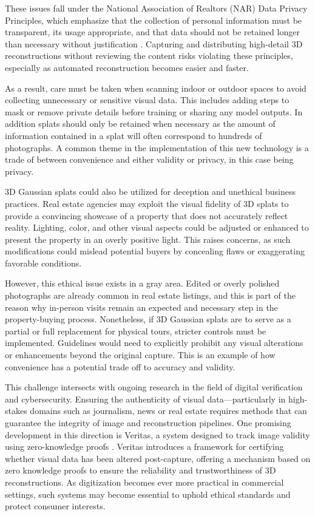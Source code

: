 \documentclass[10pt,twocolumn]{article}
\begin{document}
These issues fall under the National Association of Realtors (NAR) Data Privacy Principles, which emphasize that the collection of personal information must be transparent, its usage appropriate, and that data should not be retained longer than necessary without justification \cite{narDataPrivacyPrinciples}. Capturing and distributing high-detail 3D reconstructions without reviewing the content risks violating these principles, especially as automated reconstruction becomes easier and faster.

As a result, care must be taken when scanning indoor or outdoor spaces to avoid collecting unnecessary or sensitive visual data. This includes adding steps to mask or remove private details before training or sharing any model outputs. In addition splats should only be retained when necessary as the amount of information contained in a splat will often correspond to hundreds of photographs. A common theme in the implementation of this new technology is a trade of between convenience and either validity or privacy, in this case being privacy.

3D Gaussian splats could also be utilized for deception and unethical business practices. Real estate agencies may exploit the visual fidelity of 3D splats to provide a convincing showcase of a property that does not accurately reflect reality. Lighting, color, and other visual aspects could be adjusted or enhanced to present the property in an overly positive light. This raises concerns, as such modifications could mislead potential buyers by concealing flaws or exaggerating favorable conditions.

However, this ethical issue exists in a gray area. Edited or overly polished photographs are already common in real estate listings, and this is part of the reason why in-person visits remain an expected and necessary step in the property-buying process. Nonetheless, if 3D Gaussian splats are to serve as a partial or full replacement for physical tours, stricter controls must be implemented. Guidelines would need to explicitly prohibit any visual alterations or enhancements beyond the original capture. This is an example of how convenience has a potential trade off to accuracy and validity.

This challenge intersects with ongoing research in the field of digital verification and cybersecurity. Ensuring the authenticity of visual data—particularly in high-stakes domains such as journalism, news or real estate requires methods that can guarantee the integrity of image and reconstruction pipelines. One promising development in this direction is Veritas, a system designed to track image validity using zero-knowledge proofs \cite{veritas2024}. Veritas introduces a framework for certifying whether visual data has been altered post-capture, offering a mechanism based on zero knowledge proofs to ensure the reliability and trustworthiness of 3D reconstructions. As digitization becomes ever more practical in commercial settings, such systems may become essential to uphold ethical standards and protect consumer interests.
\end{document}
